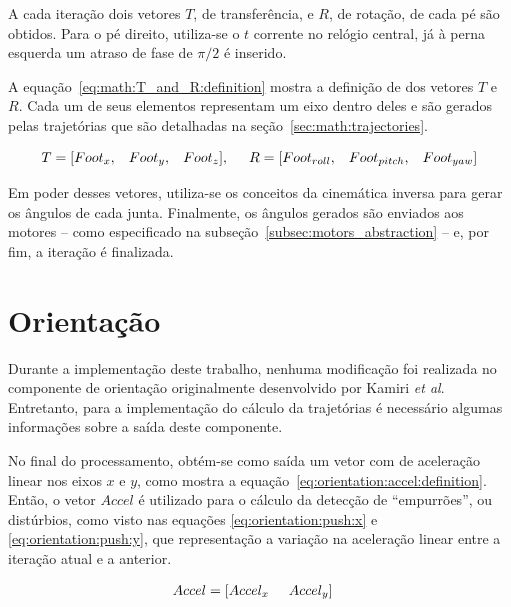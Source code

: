 A cada iteração dois vetores $T$, de transferência, e $R$, de rotação, de cada pé são obtidos. Para o pé direito, utiliza-se o $t$ corrente no relógio central, já à perna esquerda um atraso de fase de $\pi/2$ é inserido.

A equação~\ref{eq:math:T_and_R:definition} mostra a definição de dos vetores $T$ e $R$. Cada um de seus elementos representam um eixo dentro deles e são gerados pelas trajetórias que são detalhadas na seção~\ref{sec:math:trajectories}.

\begin{equation}
\label{eq:math:T_and_R:definition}
T = [Foot_x,\hspace{3mm}Foot_y,\hspace{3mm}Foot_z],\hspace{5mm}R = [Foot_{roll},\hspace{3mm}Foot_{pitch},\hspace{3mm}Foot_{yaw}]
\end{equation}

Em poder desses vetores, utiliza-se os conceitos da cinemática inversa para gerar os ângulos de cada junta. Finalmente, os ângulos gerados são enviados aos motores -- como especificado na subseção~\ref{subsec:motors_abstraction} -- e, por fim, a iteração é finalizada.

\section{Orientação}
\label{sec:math:orientation}

Durante a implementação deste trabalho, nenhuma modificação foi realizada no componente de orientação originalmente desenvolvido por Kamiri \textit{et al}. Entretanto, para a implementação do cálculo da trajetórias é necessário algumas informações sobre a saída deste componente.

No final do processamento, obtém-se como saída um vetor com de aceleração linear nos eixos $x$ e $y$, como mostra a equação~\ref{eq:orientation:accel:definition}. Então, o vetor $Accel$ é utilizado para o cálculo da detecção de ``empurrões'', ou distúrbios, como visto nas equações \ref{eq:orientation:push:x} e \ref{eq:orientation:push:y}, que representação a variação na aceleração linear entre a iteração atual e a anterior.

\begin{align}
	Accel &= [Accel_x \hspace{5mm} Accel_y] \label{eq:orientation:accel:definition}
\end{align}

